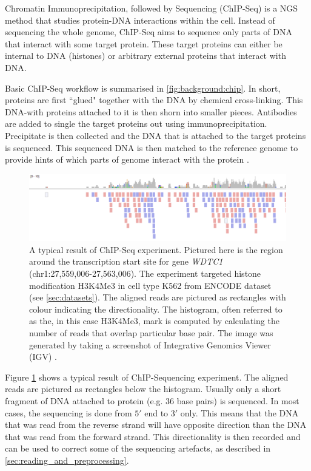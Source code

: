 \documentclass[parskip]{cs4rep}
\newcommand{\histonemodification}[1]{#1}
\newcommand{\celltype}[1]{#1}
\begin{document}
Chromatin Immunoprecipitation, followed by Sequencing (ChIP-Seq) is a NGS method that studies protein-DNA interactions within the cell. Instead of sequencing the whole genome, ChIP-Seq aims to sequence only parts of DNA that interact with some target protein. These target proteins can either be internal to DNA (histones) or arbitrary external proteins that interact with DNA.

Basic ChIP-Seq workflow is summarised in \autoref{fig:background:chip}. In short, proteins are first ``glued" together with the DNA by chemical cross-linking. This DNA-with proteins attached to it is then shorn into smaller pieces. Antibodies are added to single the target proteins out using immunoprecipitation. Precipitate is then collected and the DNA that is attached to the target proteins is sequenced. This sequenced DNA is then matched to the reference genome to provide hints of which parts of genome interact with the protein \cite{Mardis:2007wa}.

\begin{figure}[t]
    \centering
    \includegraphics[width=\textwidth]{figures/background/igv_panel_screenshot_k562_h3k4me3_WDTC1-transparentbcg.png}
    \caption{A typical result of ChIP-Seq experiment. Pictured here is the region around the transcription start site for gene \emph{WDTC1} (chr1:27,559,006-27,563,006). The experiment targeted histone modification \histonemodification{H3K4Me3} in cell type \celltype{K562} from ENCODE dataset (see \autoref{sec:datasets}). The aligned reads are pictured as rectangles with colour indicating the directionality. The histogram, often referred to as the, in this case \histonemodification{H3K4Me3}, mark is computed by calculating the number of reads that overlap particular base pair. The image was generated by taking a screenshot of Integrative Genomics Viewer (IGV) \cite{Thorvaldsdottir:2012wy}.}
    \label{fig:background:chip-results}
\end{figure}

Figure \ref{fig:background:chip-results} shows a typical result of ChIP-Sequencing experiment.
The aligned reads are pictured as rectangles below the histogram. Usually only a short fragment of DNA attached to protein (e.g. 36 base pairs) is sequenced. In most cases, the sequencing is done from $5'$ end to $3'$ only\cite{Park:2009wc}. This means that the DNA that was read from the reverse strand will have opposite direction than the DNA that was read from the forward strand. This directionality is then recorded and can be used to correct some of the sequencing artefacts, as described in \autoref{sec:reading_and_preprocessing}.
\end{document}
